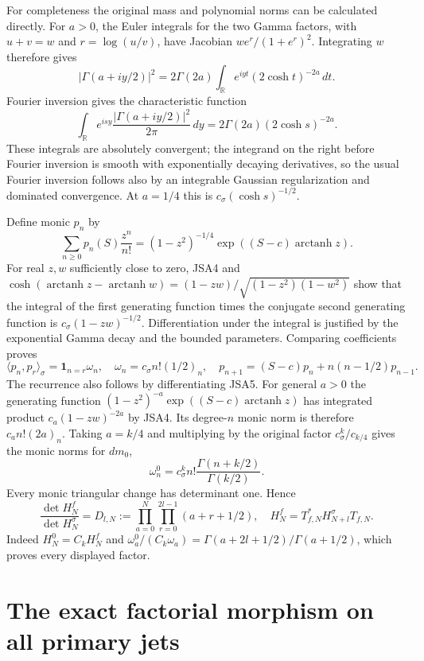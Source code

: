 For completeness the original mass and polynomial norms can be
calculated directly. For $a>0$, the Euler integrals for the two Gamma
factors, with $u+v=w$ and $r=\log(u/v)$, have Jacobian
$w e^r/(1+e^r)^2$. Integrating $w$ therefore gives
\[
 |\Gamma(a+iy/2)|^2
  =2\Gamma(2a)\int_{\mathbb R}
       e^{iyt}(2\cosh t)^{-2a}\,dt.
\]
Fourier inversion gives the characteristic function
\[
 \int_{\mathbb R}e^{isy}
    \frac{|\Gamma(a+iy/2)|^2}{2\pi}\,dy
   =2\Gamma(2a)(2\cosh s)^{-2a}.\tag{JSA4}
\]
These integrals are absolutely convergent; the integrand on the
right before Fourier inversion is smooth with exponentially
decaying derivatives, so the usual Fourier inversion follows also
by an integrable Gaussian regularization and dominated convergence.
At $a=1/4$ this is $c_\sigma(\cosh s)^{-1/2}$.

Define monic $p_n$ by
\[
 \sum_{n\geq0}p_n(S)\frac{z^n}{n!}
   =(1-z^2)^{-1/4}\exp((S-c)\operatorname{arctanh}z).
\tag{JSA5}
\]
For real $z,w$ sufficiently close to zero, JSA4 and
$\cosh(\operatorname{arctanh}z-\operatorname{arctanh}w)
=(1-zw)/\sqrt{(1-z^2)(1-w^2)}$ show that the integral of the
first generating function times the conjugate second generating
function is $c_\sigma(1-zw)^{-1/2}$. Differentiation under the
integral is justified by the exponential Gamma decay and the
bounded parameters. Comparing coefficients proves
\[
 \langle p_n,p_r\rangle_\sigma
   =\boldsymbol1_{n=r}\omega_n,
 \quad\omega_n=c_\sigma n!(1/2)_n,
 \quad p_{n+1}=(S-c)p_n+n(n-1/2)p_{n-1}.
\tag{JSA6}
\]
The recurrence also follows by differentiating JSA5. For general
$a>0$ the generating function
$(1-z^2)^{-a}\exp((S-c)\operatorname{arctanh}z)$ has integrated
product $c_a(1-zw)^{-2a}$ by JSA4. Its degree-$n$ monic norm is
therefore $c_a n!(2a)_n$. Taking $a=k/4$ and multiplying by the
original factor $c_\sigma^k/c_{k/4}$ gives the monic norms for $dm_0$,
\[
 \omega_n^0=c_\sigma^k n!\frac{\Gamma(n+k/2)}{\Gamma(k/2)}.
\]
Every monic triangular change has determinant one. Hence
\[
 \frac{\det H_N^f}{\det H_N^\sigma}
   =D_{l,N}:=\prod_{a=0}^N\prod_{r=0}^{2l-1}(a+r+1/2),
 \quad H_N^f=T_{f,N}^*H_{N+l}^\sigma T_{f,N}.
\tag{JSA7}
\]
Indeed $H_N^0=C_kH_N^f$ and
$\omega_a^0/(C_k\omega_a)=\Gamma(a+2l+1/2)/\Gamma(a+1/2)$,
which proves every displayed factor.

\section{The exact factorial morphism on all primary jets}

